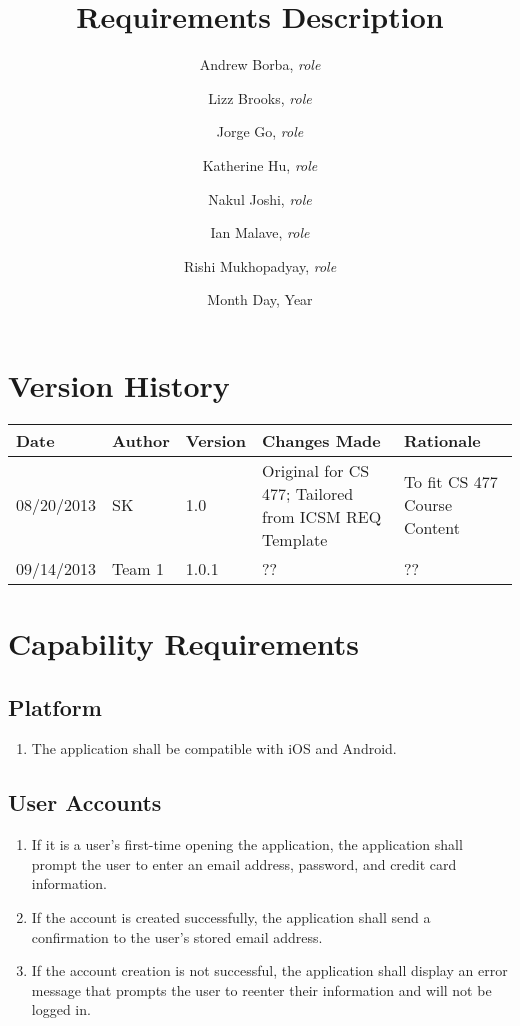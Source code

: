 \documentclass[titlepage, twoside]{article}
\title{Requirements Description}
\author{
	Andrew Borba, \emph{role}	\and
	 Lizz Brooks, \emph{role}	\and
	 Jorge Go, \emph{role}	\and
	 Katherine Hu, \emph{role}	\and
	 Nakul Joshi, \emph{role}	\and
	 Ian Malave, \emph{role}	\and
	 Rishi Mukhopadyay, \emph{role}
}%
\date{Month Day, Year}
\begin{document}
\maketitle

\tableofcontents
\newpage
\section{Version History}
\begin{table}[h]
	\centering
    \begin{tabularx}{\textwidth}{lllXX}
    	\hline
        Date       & Author & Version & Changes Made                                         & Rationale                    \\ \hline
        08/20/2013 & SK     & 1.0     & Original for CS 477; Tailored from ICSM REQ Template & To fit CS 477 Course Content \\ 
        09/14/2013 & Team 1 & 1.0.1   & ??                                                   & ??                           \\

    \end{tabularx}
\end{table}
\newpage
\section{Capability Requirements}

	\subsection{Platform}\begin{enumerate}
		\item The application shall be compatible with iOS and Android.
	\end{enumerate}
	
	\subsection{User Accounts}\begin{enumerate}
		\item If it is a user’s first-time opening the application, the application shall prompt the user to enter an email address, password, and credit card information. 
		\item If the account is created successfully, the application shall send a confirmation to the user’s stored email address.
		\item If the account creation is not successful, the application shall display an error message that prompts the user to reenter their information and will not be logged in.
	\end{enumerate}
	
\end{document}
